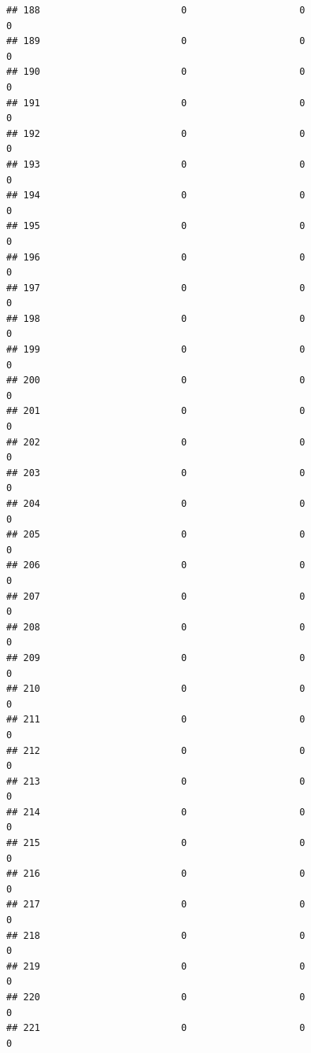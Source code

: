 \documentclass[
]{article}
\begin{document}
\begin{verbatim}
## 188                         0                    0                      0
## 189                         0                    0                      0
## 190                         0                    0                      0
## 191                         0                    0                      0
## 192                         0                    0                      0
## 193                         0                    0                      0
## 194                         0                    0                      0
## 195                         0                    0                      0
## 196                         0                    0                      0
## 197                         0                    0                      0
## 198                         0                    0                      0
## 199                         0                    0                      0
## 200                         0                    0                      0
## 201                         0                    0                      0
## 202                         0                    0                      0
## 203                         0                    0                      0
## 204                         0                    0                      0
## 205                         0                    0                      0
## 206                         0                    0                      0
## 207                         0                    0                      0
## 208                         0                    0                      0
## 209                         0                    0                      0
## 210                         0                    0                      0
## 211                         0                    0                      0
## 212                         0                    0                      0
## 213                         0                    0                      0
## 214                         0                    0                      0
## 215                         0                    0                      0
## 216                         0                    0                      0
## 217                         0                    0                      0
## 218                         0                    0                      0
## 219                         0                    0                      0
## 220                         0                    0                      0
## 221                         0                    0                      0

\end{verbatim}
\end{document}
